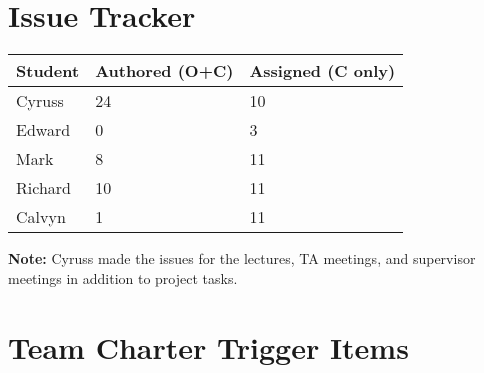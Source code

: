 \documentclass{article}
\begin{document}
\section{Issue Tracker}


\begin{table}[H]
\centering
\begin{tabular}{lll}
\toprule
\textbf{Student} & \textbf{Authored (O+C)} & \textbf{Assigned (C only)}\\
\midrule
Cyruss & 24 & 10 \\
Edward & 0 & 3 \\
Mark & 8 & 11 \\
Richard & 10 & 11 \\
Calvyn & 1 & 11 \\
\bottomrule
\end{tabular}
\end{table}


\textbf{Note:} Cyruss made the issues for the lectures, TA meetings, and supervisor meetings in addition to project tasks.

\section{Team Charter Trigger Items}
\end{document}
